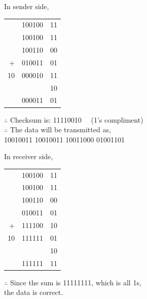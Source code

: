 \begin{minipage}[t]{0.45\textwidth}
In sender side,\\[0.5em]
\begin{tabular}{rl@{}l}
      & 100100&11\\[-0.5em]
      & 100100&11\\[-0.5em]
      & 100110&00\\[-0.5em]
  $+$ & 010011&01\\\hline
   10 & 000010&11\\[-0.5em]
      &       &10\\\hline
      & 000011&01
\end{tabular}

\vspace{1em}
$\therefore$ Checksum is: 11110010 \ \ (1's compliment)\\[0.5em]
$\therefore$ The data will be transmitted as,\\
10010011 10010011 10011000 01001101 
\end{minipage}%
\hfill\vrule\hfill%
\begin{minipage}[t]{0.45\textwidth}
In receiver side,\\[0.5em]
\begin{tabular}{rl@{}l}
      & 100100&11\\[-0.5em]
      & 100100&11\\[-0.5em]
      & 100110&00\\[-0.5em]
      & 010011&01\\[-0.5em]
  $+$ & 111100&10\\\hline
   10 & 111111&01\\[-0.5em]
      &       &10\\\hline
      & 111111&11
\end{tabular}

\vspace{1em}
$\therefore$ Since the sum is 11111111, which is all 1s,\\
the data is correct.
\end{minipage}
